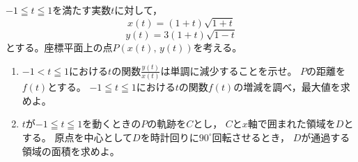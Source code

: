 \documentclass[../../main.tex]{subfiles}
\begin{document}
$-1 \leqq t \leqq 1$を満たす実数$t$に対して，
\[ x(t)=(1+t)\sqrt{1+t} \]
\[ y(t)=3(1+t)\sqrt{1-t} \]
とする。座標平面上の点$P(x(t), \, y(t))$を考える。
\begin{enumerate}
  \item$-1<t\leqq1$における$t$の関数$\displaystyle\frac{y(t)}{x(t)}$は単調に減少することを示せ。
  $P$の距離を$f(t)$とする。
    $-1 \leqq t \leqq 1$における$t$の関数$f(t)$の増減を調べ，最大値を求めよ。
  \item$t$が$-1 \leqq t \leqq 1$を動くときの$P$の軌跡を$C$とし，
    $C$と$x$軸で囲まれた領域を$D$とする。
    原点を中心として$D$を時計回りに${90}^\circ$回転させるとき，
    $D$が通過する領域の面積を求めよ。
\end{enumerate}
\end{document}
